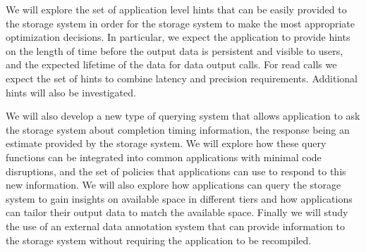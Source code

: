 We will explore the
set of application level hints that can be easily provided to the storage
system in order for the storage system to make the most appropriate
optimization decisions. In particular, we expect the application to provide
hints on the length of time before the output data is persistent and
visible to users, and the expected lifetime of the data for data output
calls. For read calls we expect the set of hints to combine latency and
precision requirements. Additional hints will also be investigated. 

We will also develop a new type of querying system that allows application
to ask the storage system about completion timing information, the response
being an estimate provided by the storage system. We will explore how these
query functions can be integrated into common applications with minimal code
disruptions, and the set of policies that applications can use to respond to
this new information. We will also explore how applications can query the
storage system to gain insights on available space in different tiers and
how applications can tailor their output data to match the available space. 
Finally we will study the use of an external data annotation system that can
provide information to the storage system without requiring the application
to be recompiled. 


